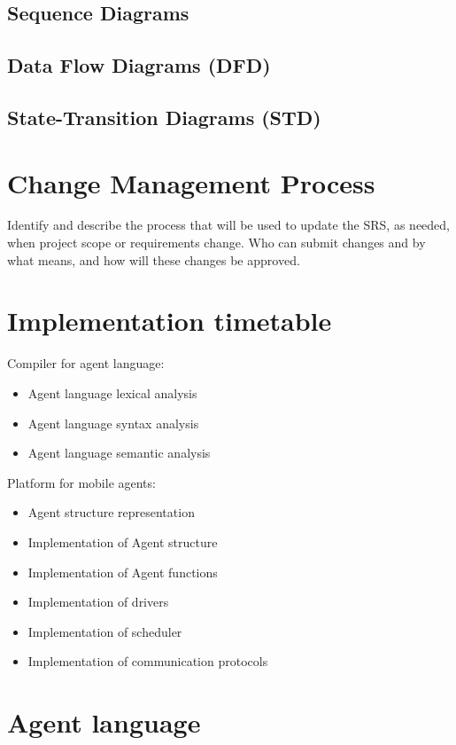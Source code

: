\documentclass{scrreprt}
\begin{document}
	\section{Sequence Diagrams}

	\section{Data Flow Diagrams (DFD)}

	\section{State-Transition Diagrams (STD)}

\chapter{Change Management Process}

Identify and describe the process that will be used to update the SRS, as needed, when project scope or requirements change.  Who can submit changes and by what means, and how will these changes be approved.

\chapter{Implementation timetable}

Compiler for agent language:
\begin{itemize}
\item Agent language lexical analysis
\item Agent language syntax analysis
\item Agent language semantic analysis
\end{itemize}

Platform for mobile agents:

\begin{itemize}
\item Agent structure representation
\item Implementation of Agent structure
\item Implementation of Agent functions
\item Implementation of drivers
\item Implementation of scheduler
\item Implementation of communication protocols

\end{itemize}

\chapter {Agent language}
\end{document}
